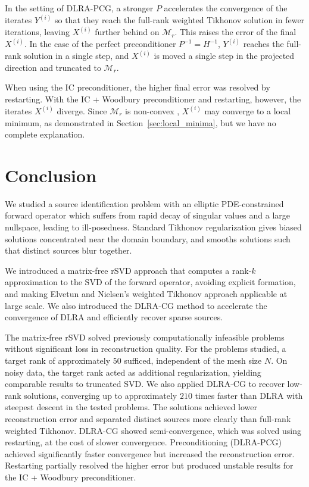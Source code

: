 In the setting of DLRA-PCG, a stronger $P$ accelerates the convergence of the iterates $Y^{(i)}$ so that they reach the full-rank weighted Tikhonov solution in fewer iterations, leaving $X^{(i)}$ further behind on $\mathcal{M}_r$. This raises the error of the final $X^{(i)}$. In the case of the perfect preconditioner $P^{-1} = H^{-1}$, $Y^{(i)}$ reaches the full-rank solution in a single step, and $X^{(i)}$ is moved a single step in the projected direction and truncated to $\mathcal{M}_r$.

When using the IC preconditioner, the higher final error was resolved by restarting. With the IC + Woodbury preconditioner and restarting, however, the iterates $X^{(i)}$ diverge. Since $\mathcal{M}_r$ is non-convex \cite{absilOptimizationAlgorithmsMatrix2008}, $X^{(i)}$ may converge to a local minimum, as demonstrated in Section~\ref{sec:local_minima}, but we have no complete explanation.

\section{Conclusion}\label{sec:conclusion}
We studied a source identification problem with an elliptic PDE-constrained forward operator which suffers from rapid decay of singular values and a large nullspace, leading to ill-posedness. Standard Tikhonov regularization gives biased solutions concentrated near the domain boundary, and smooths solutions such that distinct sources blur together.

We introduced a matrix-free rSVD approach that computes a rank-$k$ approximation to the SVD of the forward operator, avoiding explicit formation, and making Elvetun and Nielsen's weighted Tikhonov approach applicable at large scale. We also introduced the DLRA-CG method to accelerate the convergence of DLRA and efficiently recover sparse sources.

The matrix-free rSVD solved previously computationally infeasible problems without significant loss in reconstruction quality. For the problems studied, a target rank of approximately $50$ sufficed, independent of the mesh size $N$. On noisy data, the target rank acted as additional regularization, yielding comparable results to truncated SVD.
We also applied DLRA-CG to recover low-rank solutions, converging up to approximately $210$ times faster than DLRA with steepest descent in the tested problems. The solutions achieved lower reconstruction error and separated distinct sources more clearly than full-rank weighted Tikhonov. DLRA-CG showed semi-convergence, which was solved using restarting, at the cost of slower convergence. Preconditioning (DLRA-PCG) achieved significantly faster convergence but increased the reconstruction error. Restarting partially resolved the higher error but produced unstable results for the IC + Woodbury preconditioner.

